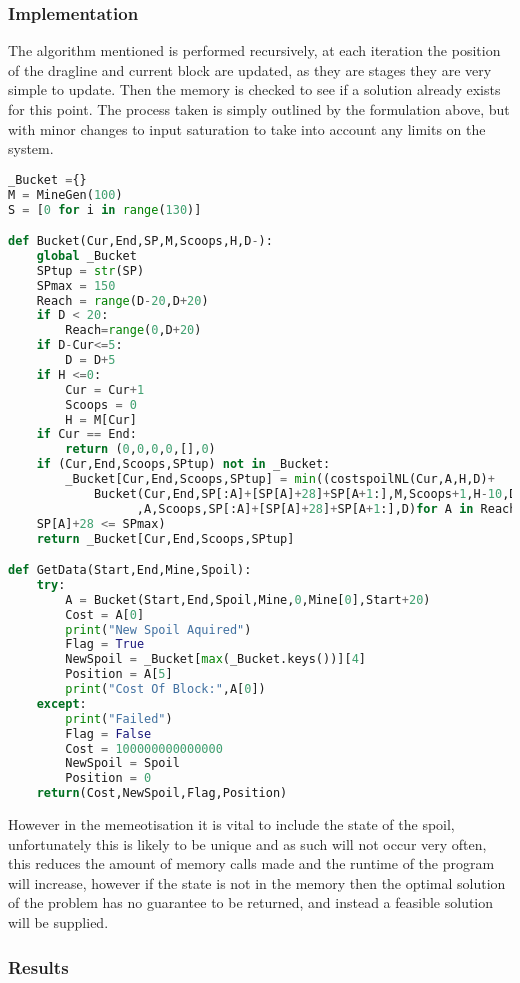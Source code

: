 \subsubsection{Implementation}
The algorithm mentioned is performed recursively, at each iteration the position of the dragline and current block are updated, as they are stages they are very simple to update. Then the memory is checked to see if a solution already exists for this point. The process taken is simply outlined by the formulation above, but with minor changes to input saturation to take into account any limits on the system.
\begin{lstlisting}[language=python]
_Bucket ={}
M = MineGen(100)
S = [0 for i in range(130)]

def Bucket(Cur,End,SP,M,Scoops,H,D-):
    global _Bucket
    SPtup = str(SP)
    SPmax = 150
    Reach = range(D-20,D+20) 
    if D < 20:
        Reach=range(0,D+20) 
    if D-Cur<=5:
        D = D+5
    if H <=0:
        Cur = Cur+1
        Scoops = 0
        H = M[Cur]
    if Cur == End:
        return (0,0,0,0,[],0)
    if (Cur,End,Scoops,SPtup) not in _Bucket:
        _Bucket[Cur,End,Scoops,SPtup] = min((costspoilNL(Cur,A,H,D)+
            Bucket(Cur,End,SP[:A]+[SP[A]+28]+SP[A+1:],M,Scoops+1,H-10,D)[0],Cur\
                  ,A,Scoops,SP[:A]+[SP[A]+28]+SP[A+1:],D)for A in Reach if\
    SP[A]+28 <= SPmax)
    return _Bucket[Cur,End,Scoops,SPtup]

def GetData(Start,End,Mine,Spoil):
    try:
        A = Bucket(Start,End,Spoil,Mine,0,Mine[0],Start+20)
        Cost = A[0]        
        print("New Spoil Aquired")
        Flag = True
        NewSpoil = _Bucket[max(_Bucket.keys())][4]
        Position = A[5]
        print("Cost Of Block:",A[0])
    except:
        print("Failed")
        Flag = False
        Cost = 100000000000000
        NewSpoil = Spoil
        Position = 0
    return(Cost,NewSpoil,Flag,Position)

\end{lstlisting}
However in the memeotisation it is vital to include the state of the spoil, unfortunately this is likely to be unique and as such will not occur very often, this reduces the amount of memory calls made and the runtime of the program will increase, however if the state is not in the memory then the optimal solution of the problem has no guarantee to be returned, and instead a feasible solution will be supplied. 
\subsubsection{Results}
